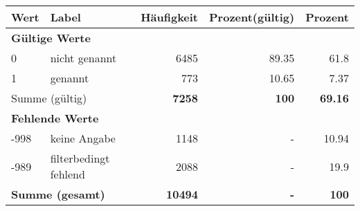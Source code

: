      \begin{longtable}{lXrrr}
     \toprule
     \textbf{Wert} & \textbf{Label} & \textbf{Häufigkeit} & \textbf{Prozent(gültig)} & \textbf{Prozent} \\
     \endhead
     \midrule
     \multicolumn{5}{l}{\textbf{Gültige Werte}}\\

     0 &
     \multicolumn{1}{X}{ nicht genannt   } &


       \num{6485} &
       \num[round-mode=places,round-precision=2]{89.35} &
         \num[round-mode=places,round-precision=2]{61.8} \\

     1 &
     \multicolumn{1}{X}{ genannt   } &


       \num{773} &
       \num[round-mode=places,round-precision=2]{10.65} &
         \num[round-mode=places,round-precision=2]{7.37} \\
     \midrule
     \multicolumn{2}{l}{Summe (gültig)} &
       \textbf{\num{7258}} &
     \textbf{\num{100}} &
       \textbf{\num[round-mode=places,round-precision=2]{69.16}} \\
     \multicolumn{5}{l}{\textbf{Fehlende Werte}}\\
       -998 &
       keine Angabe &
         \num{1148} &
        - &
         \num[round-mode=places,round-precision=2]{10.94} \\
       -989 &
       filterbedingt fehlend &
         \num{2088} &
        - &
         \num[round-mode=places,round-precision=2]{19.9} \\
     \midrule
     \multicolumn{2}{l}{\textbf{Summe (gesamt)}} &
          \textbf{\num{10494}} &
        \textbf{-} &
        \textbf{\num{100}} \\
     \bottomrule
     \end{longtable}
     
